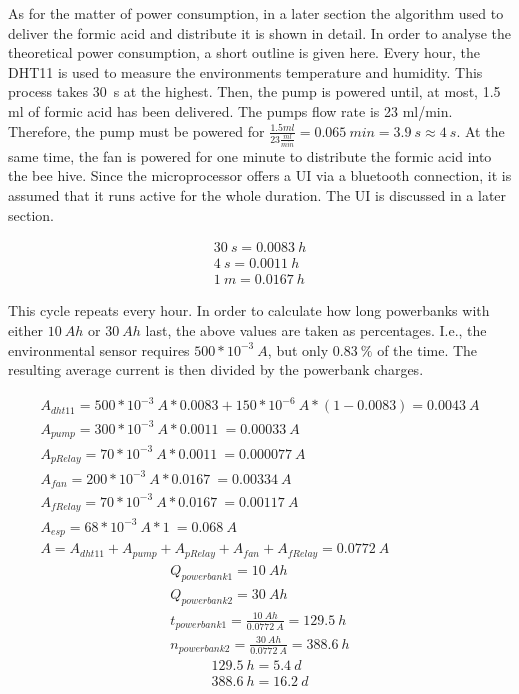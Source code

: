 As for the matter of power consumption, in a later section the algorithm used to deliver the formic acid and distribute it is shown in detail. %
In order to analyse the theoretical power consumption, a short outline is given here.
Every hour, the DHT11 is used to measure the environments temperature and humidity.
This process takes 30\ s at the highest.
Then, the pump is powered until, at most, 1.5 ml of formic acid has been delivered.
The pumps flow rate is 23 ml/min.
Therefore, the pump must be powered for $\frac{1.5 ml}{23 \frac{ml}{min}} = 0.065\ min = 3.9\ s \approx 4\ s$.
At the same time, the fan is powered for one minute to distribute the formic acid into the bee hive.
Since the microprocessor offers a UI via a bluetooth connection, it is assumed that it runs active for the whole duration.
The UI is discussed in a later section. %

\begin{align}
    30\ s = 0.0083\ h \\
    4\ s = 0.0011\ h \\
    1\ m = 0.0167\ h
\end{align}

This cycle repeats every hour.
In order to calculate how long powerbanks with either $10\ Ah$ or $30\ Ah$ last, the above values are taken as percentages.
I.e., the environmental sensor requires $500 * 10^{-3}\ A$, but only $0.83\ \%$ of the time.
The resulting average current is then divided by the powerbank charges.

\begin{align}
    A_{dht11} = 500 * 10^{-3}\ A * 0.0083 + 150 * 10^{-6}\ A * (1 - 0.0083) = 0.0043\ A\\
    A_{pump} = 300 * 10^{-3}\ A * 0.0011\  = 0.00033\ A\\
    A_{pRelay} = 70 * 10^{-3}\ A * 0.0011\  = 0.000077\ A\\
    A_{fan} = 200 * 10^{-3}\ A * 0.0167\  = 0.00334\ A\\
    A_{fRelay} = 70 * 10^{-3}\ A * 0.0167\  = 0.00117\ A\\
    A_{esp} = 68*10^{-3}\ A * 1\  = 0.068\ A \\
    A = A_{dht11} + A_{pump} + A_{pRelay} + A_{fan} + A_{fRelay} = 0.0772\ A
\end{align}
\begin{align}
    Q_{powerbank1} = 10\ Ah \\
    Q_{powerbank2} = 30\ Ah \\
    t_{powerbank1} = \frac{10\ Ah}{0.0772\ A} = 129.5\ h \\
    n_{powerbank2} = \frac{30\ Ah}{0.0772\ A} = 388.6\ h
\end{align}
\begin{align}
    129.5\ h = 5.4\ d \\
    388.6\ h = 16.2\ d
\end{align}

